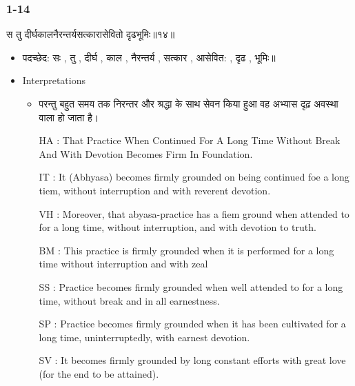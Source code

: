 \begin{frame}[fragile]\frametitle{1-14}
\begin{sanskrit}
स तु दीर्घकालनैरन्तर्यसत्कारासेवितो दृढभूमिः॥१४॥
\end{sanskrit}

	\begin{itemize}
	\item पदच्छेद: सः , तु , दीर्घ , काल , नैरन्तर्य , सत्कार , आसेवित: , दृढ , भूमिः॥
	\item Interpretations
		\begin{itemize}	
		\item परन्तु बहुत समय तक निरन्तर और श्रद्धा के साथ सेवन किया हुआ वह अभ्यास दृढ़ अवस्था वाला हो जाता है।
		\item [HA]: That Practice When Continued For A Long Time Without Break And With Devotion Becomes Firm In Foundation.
		\item [IT]: It (Abhyasa) becomes firmly grounded on being continued foe a long tiem, without interruption and with reverent devotion.
		\item [VH]: Moreover, that abyasa-practice has a fiem ground when attended to for a long time, without interruption, and with devotion to truth.
		\item [BM]: This practice is firmly grounded when it is performed for a long time without interruption and with zeal
		\item [SS]: Practice becomes firmly grounded when well attended to for a long time, without break and in all earnestness.
		\item [SP]: Practice becomes firmly grounded when it has been cultivated for a long time, uninterruptedly, with earnest devotion.
		\item [SV]: It becomes firmly grounded by long constant efforts with great love (for the end to be attained). 
		\end{itemize}
	\end{itemize}
	
\end{frame}

